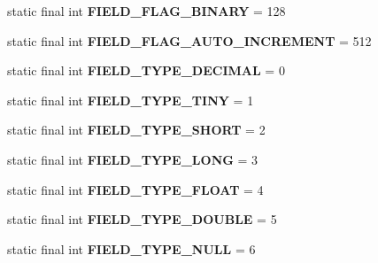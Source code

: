 \begin{DoxyCompactItemize}
static final int {\bfseries F\+I\+E\+L\+D\+\_\+\+F\+L\+A\+G\+\_\+\+B\+I\+N\+A\+RY} = 128
\item 
\mbox{\label{enumcom_1_1mysql_1_1cj_1_1_mysql_type_a463794129f72400e3cbbffc8072485fe}} 
static final int {\bfseries F\+I\+E\+L\+D\+\_\+\+F\+L\+A\+G\+\_\+\+A\+U\+T\+O\+\_\+\+I\+N\+C\+R\+E\+M\+E\+NT} = 512
\item 
\mbox{\label{enumcom_1_1mysql_1_1cj_1_1_mysql_type_a2cbe87788a125a2d10a98d09de7650a7}} 
static final int {\bfseries F\+I\+E\+L\+D\+\_\+\+T\+Y\+P\+E\+\_\+\+D\+E\+C\+I\+M\+AL} = 0
\item 
\mbox{\label{enumcom_1_1mysql_1_1cj_1_1_mysql_type_a5d895223f069be6274a3b4dc106e5ae9}} 
static final int {\bfseries F\+I\+E\+L\+D\+\_\+\+T\+Y\+P\+E\+\_\+\+T\+I\+NY} = 1
\item 
\mbox{\label{enumcom_1_1mysql_1_1cj_1_1_mysql_type_af7e36911e7651946d26a2756d624e4c3}} 
static final int {\bfseries F\+I\+E\+L\+D\+\_\+\+T\+Y\+P\+E\+\_\+\+S\+H\+O\+RT} = 2
\item 
\mbox{\label{enumcom_1_1mysql_1_1cj_1_1_mysql_type_a6fcf496498a0bb4fc8692522fd78b63b}} 
static final int {\bfseries F\+I\+E\+L\+D\+\_\+\+T\+Y\+P\+E\+\_\+\+L\+O\+NG} = 3
\item 
\mbox{\label{enumcom_1_1mysql_1_1cj_1_1_mysql_type_a16c7e065306cd60988ba2ac770d0456b}} 
static final int {\bfseries F\+I\+E\+L\+D\+\_\+\+T\+Y\+P\+E\+\_\+\+F\+L\+O\+AT} = 4
\item 
\mbox{\label{enumcom_1_1mysql_1_1cj_1_1_mysql_type_a5110864ecdc11b7ecf72217a57bdd91d}} 
static final int {\bfseries F\+I\+E\+L\+D\+\_\+\+T\+Y\+P\+E\+\_\+\+D\+O\+U\+B\+LE} = 5
\item 
\mbox{\label{enumcom_1_1mysql_1_1cj_1_1_mysql_type_aec6ea83bd1d1bbc9f00b80a2ae812c52}} 
static final int {\bfseries F\+I\+E\+L\+D\+\_\+\+T\+Y\+P\+E\+\_\+\+N\+U\+LL} = 6
\item 

\end{DoxyCompactItemize}
